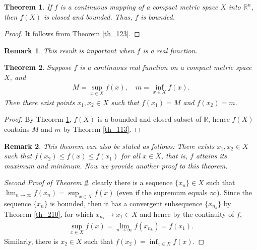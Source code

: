 \documentclass[11pt]{book}
\newtheorem{theorem}{Theorem}[chapter]
\newtheorem{remark}{Remark}[chapter]
\theoremstyle{definition}
\numberwithin{equation}{chapter}
\begin{document}
\medskip

\begin{theorem}\label{th_310}
If $f$ is a continuous mapping of a compact metric space $X$ into $\mathbb{R}^n$, then $f(X)$ is closed and bounded. Thus, $f$ is bounded.
\end{theorem}
\begin{proof}
It follows from Theorem \ref{th_123}.
\end{proof}

\begin{remark}
This result is important when $f$ is a real function.
\end{remark}

\medskip

\begin{theorem}\label{th_311}
Suppose $f$ is a continuous real function on a compact metric space $X$, and
\begin{align*}
    M = \sup_{x\in X} f(x), \quad m = \inf_{x\in X} f(x).
\end{align*}
Then there exist points $x_1, x_2 \in X$ such that $f(x_1) = M$ and $f(x_2) = m$.
\end{theorem}
\begin{proof}
By Theorem \ref{th_310}, $f(X)$ is a bounded and closed subset of $\mathbb{R}$, hence $f(X)$ contains $M$ and $m$ by Theorem \ref{th_113}.
\end{proof}

\begin{remark}
This theorem can also be stated as follows: There exists $x_1, x_2 \in X$ such that $f(x_2) \leq f(x) \leq f(x_1)$ for all $x \in X$, that is, $f$ attains its maximum and minimum. Now we provide another proof to this theorem.
\end{remark}

\medskip

\begin{proof}[Second Proof of Theorem \ref{th_311}]
clearly there is a sequence $\{x_n\} \in X$ such that $\lim_{n\to\infty} f(x_n) = \sup_{x\in X} f(x)$ (even if the supremum equals $\infty$).  Since the sequence $\{x_n\}$ is bounded, then it has a convergent subsequence $\{x_{n_k}\}$ by Theorem \ref{th_210}, for which $x_{n_k} \to x_1 \in X$ and hence by the continuity of $f$,
\begin{align*}
    \sup_{x \in X} f(x) = \lim_{n\to\infty} f(x_{n_k}) = f(x_1).
\end{align*}
Similarly, there is $x_2 \in X$ such that $f(x_2) = \inf_{x\in X} f(x)$. 
\end{proof}
\end{document}
